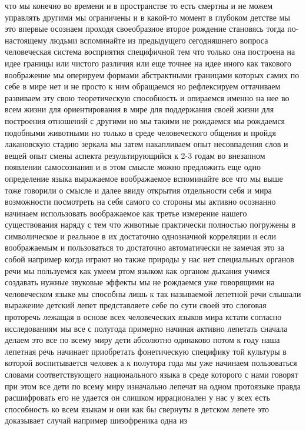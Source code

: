 что мы конечно во времени и в пространстве то есть смертны и не можем управлять
другими мы ограничены и в какой-то момент в глубоком детстве мы это впервые
осознаем проходя своеобразное второе рождение становясь тогда по-настоящему
людьми вспоминайте из предыдущего сегодняшнего вопроса человеческая система
восприятия специфичной тем что только она построена на идее границы или чистого
различия или еще точнее на идее иного как такового воображение мы оперируем
формами абстрактными границами которых самих по себе в мире нет и не просто к
ним обращаемся но рефлексируем оттачиваем развиваем эту свою теоретическую
способность и опираемся именно на нее во всем жизни для ориентирования в мире
для поддержания своей жизни для построения отношений с другими но мы такими не
рождаемся мы рождаемся подобными животными но только в среде человеческого
общения и пройдя лакановскую стадию зеркала мы затем накапливаем опыт
несовпадения слов и вещей опыт смены аспекта результирующийся к 2-3 годам во
внезапном появлении самосознания и в этом смысле можно предложить еще одно
определение языка выражаемое воображаемое вспоминайте все что мы выше тоже
говорили о смысле и далее ввиду открытия отдельности себя и мира возможности
посмотреть на себя самого со стороны мы активно осознанно начинаем использовать
воображаемое как третье измерение нашего существования наряду с тем что животные
практически полностью погружены в символическое и реальное в их достаточно
однозначной корреляции и если воображаемым и пользоваться то достаточно
автоматически не замечая это за собой например когда играют но также природы у
нас нет специальных органов речи мы пользуемся как умеем ртом языком как органом
дыхания учимся создавать нужные звуковые эффекты мы не рождаемся уже говорящими
на человеческом языке мы способны лишь к так называемой лепетной речи слышали
выражение детский лепет представляете себе по сути своей это слоговая проторечь
лежащая в основе всех человеческих языков мира кстати согласно исследованиям мы
все с полугода примерно начиная активно лепетать сначала делаем это все по всему
миру дети абсолютно одинаково потом к году наша лепетная речь начинает
приобретать фонетическую специфику той культуры в которой воспитывается человек
а к полутора года мы уже начинаем пользоваться словами соответствующего
национального языка в среде которого с нами говорят при этом все дети по всему
миру изначально лепечат на одном протоязыке правда расшифровать его не удается
он слишком иррационален у нас у всех есть способность ко всем языкам и они как
бы свернуты в детском лепете это доказывает случай например шизофреника одна из
